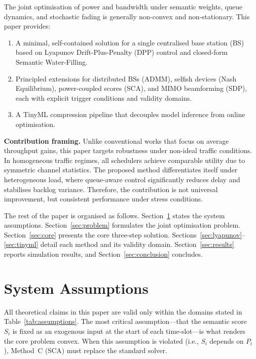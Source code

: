 \documentclass[conference]{IEEEtran}
\begin{document}
The joint optimisation of power and bandwidth under semantic weights, queue dynamics, and stochastic fading is generally non-convex and non-stationary. This paper provides:
\begin{enumerate}
  \item A minimal, self-contained solution for a single centralised base station (BS) based on Lyapunov Drift-Plus-Penalty (DPP) control and closed-form Semantic Water-Filling.
  \item Principled extensions for distributed BSs (ADMM), selfish devices (Nash Equilibrium), power-coupled scores (SCA), and MIMO beamforming (SDP), each with explicit trigger conditions and validity domains.
  \item A TinyML compression pipeline that decouples model inference from online optimisation.
\end{enumerate}

\textbf{Contribution framing.}
Unlike conventional works that focus on average throughput gains, this paper targets robustness under non-ideal traffic conditions. In homogeneous traffic regimes, all schedulers achieve comparable utility due to symmetric channel statistics. The proposed method differentiates itself under heterogeneous load, where queue-aware control significantly reduces delay and stabilises backlog variance. Therefore, the contribution is not universal improvement, but consistent performance under stress conditions.

The rest of the paper is organised as follows. Section~\ref{sec:assumptions} states the system assumptions. Section~\ref{sec:problem} formulates the joint optimisation problem. Section~\ref{sec:core} presents the core three-step solution. Sections~\ref{sec:lyapunov}--\ref{sec:tinyml} detail each method and its validity domain. Section~\ref{sec:results} reports simulation results, and Section~\ref{sec:conclusion} concludes.

\section{System Assumptions}
\label{sec:assumptions}

All theoretical claims in this paper are valid only within the domains stated in Table~\ref{tab:assumptions}. The most critical assumption---that the semantic score $S_i$ is fixed as an exogenous input at the start of each time-slot---is what renders the core problem convex. When this assumption is violated (i.e., $S_i$ depends on $P_i$), Method~C (SCA) must replace the standard solver.
\end{document}

